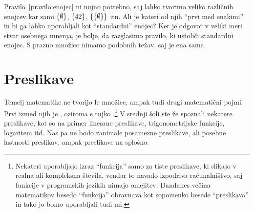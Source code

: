 Pravilo~\ref{pravilo:enojec} ni nujno potrebno, saj lahko tvorimo veliko različnih enojcev
kar sami $\set{\emptyset}$, $\set{42}$, $\set{\set{\emptyset}}$ itn. Ali je kateri od njih
``prvi med enakimi'' in bi ga lahko uporabljali kot ``standardni'' enojec? Ker je odgovor
v veliki meri stvar osebnega mnenja, je bolje, da razglasimo pravilo, ki ustoliči
standardni enojec. S prazno množico nimamo podobnih težav, saj je ena sama.





\section{Preslikave}

Temelj matematike ne tvorijo le množice, ampak tudi drugi matematični pojmi. Prvi izmed
njih je , oziroma s tujko .\footnote{Nekateri uporabljajo
  izraz ``funkcija'' samo za tiste preslikave, ki slikajo v realna ali kompleksna števila,
  vendar to navado izpodriva računalništvo, saj funkcije v programskih jezikih nimajo
  omejitev. Dandanes večina matematikov besedo ``funkcija'' obravnava kot sopomenko besede
  ``preslikava'' in tako jo bomo uporabljali tudi mi.} V srednji šoli ste že spoznali
nekatere preslikave, kot so na primer linearne preslikave, trigonometrijske funkcije,
logaritem itd. Nas pa ne bodo zanimale posamezne preslikave, ali posebne lastnosti
preslikav, ampak preslikave na splošno.

